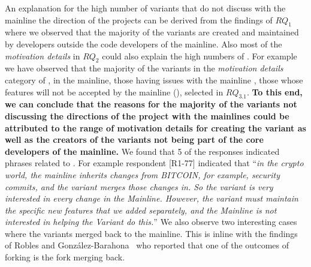 An explanation for the high number of variants that do not discuss with the mainline the direction of the projects can be derived from the findings of $RQ_{1}$ where we observed that the majority of the variants are created and maintained by developers outside the code developers of the mainline. Also most of the \emph{motivation details} in $RQ_{2}$ could also explain the high numbers of . For example we have observed that the majority of the variants in the \emph{motivation details} category of ,  in the mainline, those having issues with the mainline , those whose features will not be accepted by the mainline (), selected   in $RQ_{3.1}$. \textbf{To this end, we can conclude that the reasons for the majority of the variants not discussing the directions of the project with the mainlines could be attributed to the range of motivation details for creating the variant as well as the creators of the variants not being part of the core developers of the mainline.}
We found that 5 of the responses indicated phrases related to . For example respondent [R1-77] indicated that ``\emph{in the crypto world, the mainline inherits changes from BITCOIN, for example, security commits, and the variant merges those changes in. So the variant is very interested in every change in the Mainline. However, the variant must maintain the specific new features that we added separately, and the Mainline is not interested in helping the Variant do this.}''
We also observe two interesting cases where the variants merged back to the mainline. This is inline with the findings of Robles and Gonz{\'a}lez-Barahona~\cite{Gregorio:2012} who reported that one of the outcomes of forking is the fork merging back. 





